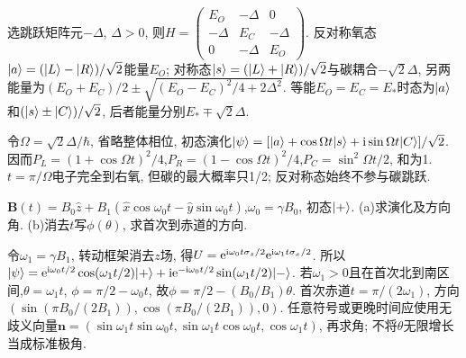 \begin{solution}
选跳跃矩阵元$-\Delta$, $\Delta>0$, 则$H=\left(\begin{smallmatrix}E_O&-\Delta&0\\-\Delta&E_C&-\Delta\\0&-\Delta&E_O\end{smallmatrix}\right)$. 反对称氧态$\lvert a\rangle=(\lvert L\rangle-\lvert R\rangle)/\sqrt2$能量$E_O$; 对称态$\lvert s\rangle=(\lvert L\rangle+\lvert R\rangle)/\sqrt2$与碳耦合$-\sqrt2\Delta$, 另两能量为$(E_O+E_C)/2\pm\sqrt{(E_O-E_C)^2/4+2\Delta^2}$. 等能$E_O=E_C=E_*$时态为$\lvert a\rangle$和$(\lvert s\rangle\pm\lvert C\rangle)/\sqrt2$, 后者能量分别$E_*\mp\sqrt2\Delta$.

令$\Omega=\sqrt2\Delta/\hbar$, 省略整体相位, 初态演化$\lvert \psi\rangle=[\lvert a\rangle+\cos\Omega t\lvert s\rangle+\mathrm i\sin\Omega t\lvert C\rangle]/\sqrt2$. 因而$P_L=(1+\cos\Omega t)^2/4$,$P_R=(1-\cos\Omega t)^2/4$,$P_C=\sin^2\Omega t/2$, 和为1. $t=\pi/\Omega$电子完全到右氧, 但碳的最大概率只1/2; 反对称态始终不参与碳跳跃.
\begin{center}\end{center}
\end{solution}
\begin{exercise}
$\boldsymbol B(t)=B_0\hat z+B_1(\hat x\cos\omega_0t-\hat y\sin\omega_0t)$,$\omega_0=\gamma B_0$, 初态$\lvert +\rangle$. (a)求演化及方向角. (b)消去$t$写$\phi(\theta)$, 求首次到赤道的方向.
\end{exercise}
\begin{solution}
令$\omega_1=\gamma B_1$, 转动框架消去$z$场, 得$U=\mathrm e^{\mathrm i\omega_0t\sigma_z/2}\mathrm e^{\mathrm i\omega_1t\sigma_x/2}$. 所以$\lvert \psi\rangle=\mathrm e^{\mathrm i\omega_0t/2}\cos(\omega_1t/2)\lvert +\rangle+\mathrm i\mathrm e^{-\mathrm i\omega_0t/2}\sin(\omega_1t/2)\lvert -\rangle$. 若$\omega_1>0$且在首次北到南区间,$\theta=\omega_1t$, $\phi=\pi/2-\omega_0t$, 故$\phi=\pi/2-(B_0/B_1)\theta$. 首次赤道$t=\pi/(2\omega_1)$, 方向$(\sin(\pi B_0/(2B_1)),\cos(\pi B_0/(2B_1)),0)$. 任意符号或更晚时间应使用无歧义向量$\boldsymbol n=(\sin\omega_1t\sin\omega_0t,\sin\omega_1t\cos\omega_0t,\cos\omega_1t)$, 再求角; 不将$\theta$无限增长当成标准极角.
\end{solution}
